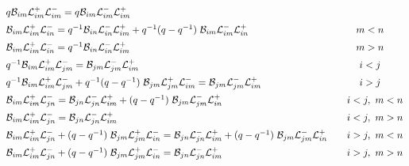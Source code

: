 \documentclass[a4paper,a4paper]{article}
\begin{document}
\begin{eqnarray}
  \label{eq:relationsslN2}
  \hspace{-1cm}
  \begin{array}{rclc}
&&    q \cB_{im} \cL^+_{im} \cL^-_{im}  =  
    q \cB_{im} \cL^-_{im} \cL^+_{im}  \\[2mm]
&&  \cB_{im}   \cL^+_{im} \cL^-_{in}  =  
    q^{-1} \cB_{in} \cL^-_{in} \cL^+_{im} + 
    q^{-1}(q-q^{-1})\; \cB_{im} \cL^-_{im}  \cL^+_{in} 
    & m<n \\[2mm]
&&  \cB_{im}   \cL^+_{im} \cL^-_{in}  =  
    q^{-1} \cB_{in} \cL^-_{in} \cL^+_{im}  & m>n \\[2mm]
&&  q^{-1} \cB_{im} \cL^+_{im} \cL^-_{jm} =  
    \cB_{jm} \cL^-_{jm} \cL^+_{im}  & i<j \\[2mm]
&&  q^{-1} \cB_{im} \cL^+_{im} \cL^-_{jm} + 
    q^{-1}(q-q^{-1})\; \cB_{jm} \cL^+_{jm} \cL^-_{im}  =  
    \cB_{jm} \cL^-_{jm} \cL^+_{im}  & i>j \\[2mm]
&&    \cB_{im} \cL^+_{im} \cL^-_{jn}  =  
    \cB_{jn} \cL^-_{jn} \cL^+_{im}  + (q-q^{-1})\; \cB_{jm} \cL^-_{jm}
    \cL^+_{in} 
    &  \quad i<j,\ m<n \\[2mm]
&&    \cB_{im} \cL^+_{im} \cL^-_{jn} =  
    \cB_{jn} \cL^-_{jn} \cL^+_{im} 
    &  \quad i<j,\ m>n \\[2mm]
&&    \cB_{im} \cL^+_{im} \cL^-_{jn} + 
    (q-q^{-1})\; \cB_{jm} \cL^+_{jm} \cL^-_{in}  =  
    \cB_{jn} \cL^-_{jn} \cL^+_{im}  
    + (q-q^{-1})\; \cB_{jm} \cL^-_{jm} \cL^+_{in}
    &  \quad i>j,\ m<n \\[2mm]
&&    \cB_{im} \cL^+_{im} \cL^-_{jn} + 
    (q-q^{-1})\; \cB_{jm} \cL^+_{jm} \cL^-_{in}  =  
    \cB_{jn} \cL^-_{jn} \cL^+_{im}  
    &  \quad i>j,\ m>n 
  \end{array}
  \nonumber \\
\end{eqnarray}

\end{document}
